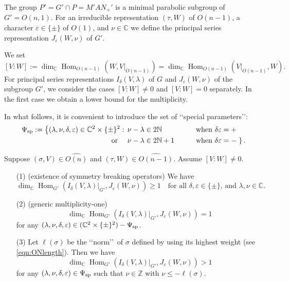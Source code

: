 The group $P'= G' \cap P = M'AN_+'$ is a minimal parabolic subgroup
 of $G'=O(n,1)$.  
For an irreducible representation $(\tau, W)$ of $O(n-1)$, a character 
 $\varepsilon\in \{\pm\}$ of $O(1)$, 
 and $\nu \in{\mathbb{C}}$ we define the principal series representation $J_\varepsilon(W,\nu)$ of $G'$.  

\medskip
We set 
\[
   [V:W]:= \dim_{\mathbb{C}}\operatorname{Hom}_{O(n-1)} (W,V|_{O(n-1)})
         = \dim_{\mathbb{C}}\operatorname{Hom}_{O(n-1)} (V|_{O(n-1)},W).  
\]
For principal series representations $I_\delta(V,\lambda )$ of $G$
 and $J_\varepsilon(W,\nu)$ of the subgroup $G'$, 
 we consider the cases $[V:W] \ne 0 $ and $[V:W] = 0$ separately. In the first case we obtain a lower bound 
for the multiplicity.  



In what follows, 
 it is convenient to introduce the set of 
 \lq\lq{special parameters}\rq\rq:
\begin{alignat}{2}
  \Psi_{{\operatorname{sp}}}
  :=
  \left\{(\lambda,\nu, \delta, \varepsilon) \in {\mathbb{C}}^2 \times \{\pm\}^2
   :\,\, \right.
&   \nu-\lambda \in 2 {\mathbb{N}}
&&\text{when $\delta \varepsilon =+$}
\notag
\\
\label{eqn:singset}
   \text{ or }\quad
& \nu-\lambda \in 2 {\mathbb{N}}+1
 \qquad
&&\text{when $\delta \varepsilon =-$}
  \left. \right\}.  
\end{alignat}



\begin{theorem}
\label{thm:intro160150}
Suppose $(\sigma,V)\in \widehat{O(n)}$ and $(\tau,W)\in \widehat{O(n-1)}$.  
Assume $[V:W] \ne 0$.  
\begin{enumerate}
\item[{\rm{(1)}}] 
{\rm{(existence of symmetry breaking operators)}}\enspace
We have
\[
  \dim_{\mathbb{C}} \operatorname{Hom}_{G'}(I_{\delta}(V, \lambda)|_{G'}, J_{\varepsilon}(W, \nu))
  \ge 1
  \quad
  \text{for all 
  $\delta, \varepsilon \in \{\pm\}$, 
  and $\lambda, \nu \in {\mathbb{C}}$}.  
\]
\item[{\rm{(2)}}]
{\rm{(generic multiplicity-one)}}\enspace
\[
\dim_{\mathbb{C}} \operatorname{Hom}_{G'}(I_{\delta}(V, \lambda)|_{G'}, J_{\varepsilon}(W, \nu))
  =1
\]
for any $(\lambda,\nu, \delta, \varepsilon) \in ({\mathbb{C}}^2 \times \{\pm\}^2) - \Psi_{{\operatorname{sp}}}$.  
\item[{\rm{(3)}}]
Let $\ell(\sigma)$ be the \lq\lq{norm}\rq\rq\
 of $\sigma$ defined by using its highest weight 
 (see \eqref{eqn:ONlength}).  
Then we have 
\[
  \dim_{\mathbb{C}} \operatorname{Hom}_{G'}
  (I_{\delta}(V, \lambda)|_{G'}, J_{\varepsilon}(W, \nu))>1
\]
 for any $(\lambda,\nu, \delta, \varepsilon) \in \Psi_{{\operatorname{sp}}}$
 such that $\nu \in {\mathbb{Z}}$ with $\nu \le -\ell(\sigma)$.  
\end{enumerate}
\end{theorem}

